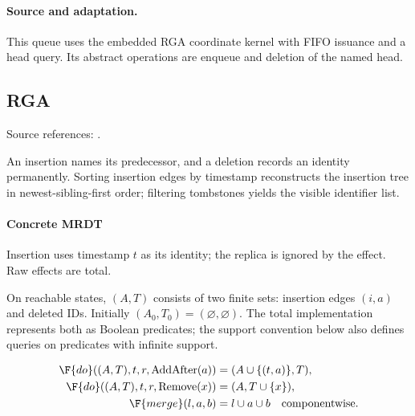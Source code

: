 \paragraph{Source and adaptation.}
This queue uses the embedded RGA coordinate kernel with FIFO issuance and a head query. Its abstract operations are enqueue and deletion of the named head.


\subsection{RGA}
\label{app:dt-rga}

\noindent Source references: \cite{Roh}.







An insertion names its predecessor, and a deletion records an identity permanently. Sorting insertion edges by timestamp reconstructs the insertion tree in newest-sibling-first order; filtering tombstones yields the visible identifier list.

\paragraph{Concrete MRDT}
Insertion uses timestamp $t$ as its identity; the replica is ignored by the effect. Raw effects are total.

On reachable states, $(A,T)$ consists of two finite sets: insertion edges
$(i,a)$ and deleted IDs. Initially $(A_0,T_0)=(\varnothing,\varnothing)$.
The total implementation represents both as Boolean predicates; the support
convention below also defines queries on predicates with infinite support.

\[
\begin{aligned}\F{do}((A,T),t,r,\operatorname{AddAfter}(a))&=(A\cup\{(t,a)\},T),\\\F{do}((A,T),t,r,\operatorname{Remove}(x))&=(A,T\cup\{x\}),\\\F{merge}(l,a,b)&=l\cup a\cup b\quad\text{componentwise}.\end{aligned}
\]


